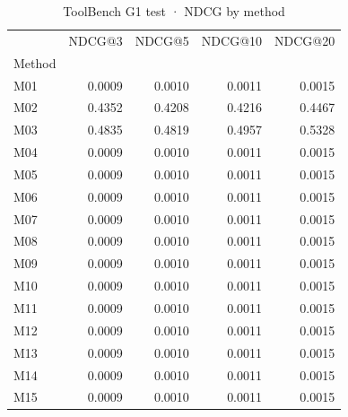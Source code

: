 \begin{table}
\caption{ToolBench G1 test · NDCG by method}
\label{tab:ToolBench-G1-test-comparison-comparison-ndcg}
\begin{tabular}{lrrrr}
\toprule
 & NDCG@3 & NDCG@5 & NDCG@10 & NDCG@20 \\
Method &  &  &  &  \\
\midrule
M01 & 0.0009 & 0.0010 & 0.0011 & 0.0015 \\
M02 & 0.4352 & 0.4208 & 0.4216 & 0.4467 \\
M03 & 0.4835 & 0.4819 & 0.4957 & 0.5328 \\
M04 & 0.0009 & 0.0010 & 0.0011 & 0.0015 \\
M05 & 0.0009 & 0.0010 & 0.0011 & 0.0015 \\
M06 & 0.0009 & 0.0010 & 0.0011 & 0.0015 \\
M07 & 0.0009 & 0.0010 & 0.0011 & 0.0015 \\
M08 & 0.0009 & 0.0010 & 0.0011 & 0.0015 \\
M09 & 0.0009 & 0.0010 & 0.0011 & 0.0015 \\
M10 & 0.0009 & 0.0010 & 0.0011 & 0.0015 \\
M11 & 0.0009 & 0.0010 & 0.0011 & 0.0015 \\
M12 & 0.0009 & 0.0010 & 0.0011 & 0.0015 \\
M13 & 0.0009 & 0.0010 & 0.0011 & 0.0015 \\
M14 & 0.0009 & 0.0010 & 0.0011 & 0.0015 \\
M15 & 0.0009 & 0.0010 & 0.0011 & 0.0015 \\
\bottomrule
\end{tabular}
\end{table}
